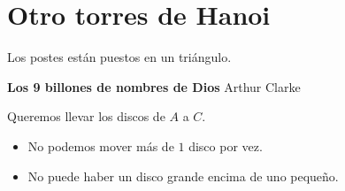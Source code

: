 \documentclass[../main.tex]{subfiles}
\begin{document}
\section{Otro torres de Hanoi}%
\label{sec:otro_torres_de_hanoi}
Los postes están puestos en un triángulo.

\textbf{Los 9 billones de nombres de Dios}
Arthur Clarke

\begin{figure}[H]
	\centering
	
\end{figure}

Queremos llevar los discos de $A$ a $C$.
\begin{itemize}
	\item No podemos mover más de $1$ disco por vez.
	\item No puede haber un disco grande encima de uno pequeño.
\end{itemize}
\end{document}
